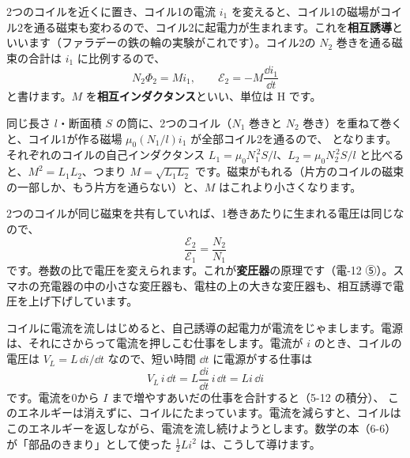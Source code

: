 \label{ph:電-8:sec7}
\noindent\begin{minipage}[c]{0.58\linewidth}\raggedright
2つのコイルを近くに置き、コイル1の電流 $i_1$ を変えると、コイル1の磁場がコイル2を通る磁束も変わるので、コイル2に起電力が生まれます。これを\textbf{相互誘導}といいます（ファラデーの鉄の輪の実験がこれです）。コイル2の $N_2$ 巻きを通る磁束の合計は $i_1$ に比例するので、
\[ N_2\Phi_{2}=Mi_1,\qquad \mathcal E_2=-M\frac{\dd i_1}{\dd t} \]
\label{ph:電-8:M}と書けます。$M$ を\textbf{相互インダクタンス}といい、単位は H です。
\end{minipage}\hfill
\begin{minipage}[c]{0.39\linewidth}\centering
{}
\end{minipage}

\noindent 同じ長さ $l$・断面積 $S$ の筒に、2つのコイル（$N_1$ 巻きと $N_2$ 巻き）を重ねて巻くと、コイル1が作る磁場 $\mu_0(N_1/l)i_1$ が全部コイル2を通るので、
となります。それぞれのコイルの自己インダクタンス $L_1=\mu_0N_1^{\,2}S/l$、$L_2=\mu_0N_2^{\,2}S/l$ と比べると、$M^2=L_1L_2$、つまり $M=\sqrt{L_1L_2}$ です。磁束がもれる（片方のコイルの磁束の一部しか、もう片方を通らない）と、$M$ はこれより小さくなります。

2つのコイルが同じ磁束を共有していれば、1巻きあたりに生まれる電圧は同じなので、
\[ \frac{\mathcal E_2}{\mathcal E_1}=\frac{N_2}{N_1} \]
です。巻数の比で電圧を変えられます。これが\textbf{変圧器}の原理です（電-12 ⑤）。スマホの充電器の中の小さな変圧器も、電柱の上の大きな変圧器も、相互誘導で電圧を上げ下げしています。

\label{ph:電-8:sec8}
コイルに電流を流しはじめると、自己誘導の起電力が電流をじゃまします。電源は、それにさからって電流を押しこむ仕事をします。電流が $i$ のとき、コイルの電圧は $V_L=L\,\dd i/\dd t$ なので、短い時間 $\dd t$ に電源がする仕事は
\[ V_L\,i\,\dd t=L\frac{\dd i}{\dd t}\,i\,\dd t=Li\,\dd i \]
です。電流を0から $I$ まで増やすあいだの仕事を合計すると（5-12 の積分）、
\label{ph:電-8:energy}このエネルギーは消えずに、コイルにたまっています。電流を減らすと、コイルはこのエネルギーを返しながら、電流を流し続けようとします。数学の本（6-6）が「部品のきまり」として使った $\tfrac12Li^2$ は、こうして導けます。

